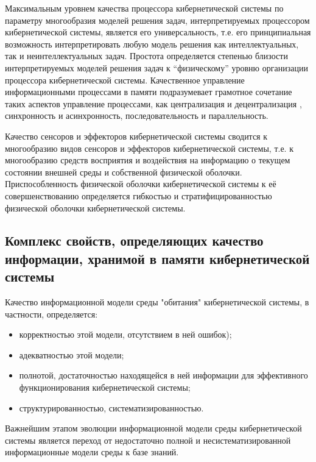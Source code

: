 Максимальным уровнем качества процессора кибернетической системы по параметру многообразия моделей решения задач, интерпретируемых процессором кибернетической системы, является его универсальность, т.е. его принципиальная возможность интерпретировать любую модель решения как интеллектуальных, так и неинтеллектуальных задач. 
Простота определяется степенью близости интерпретируемых моделей решения задач к “физическому” уровню организации процессора кибернетической системы. 
Качественное управление информационными процессами в памяти подразумевает грамотное сочетание таких аспектов управление процессами, как централизация и децентрализация \cite{melekhova2018decentralised}, синхронность и асинхронность, последовательность и параллельность.

Качество сенсоров и эффекторов кибернетической системы сводится к многообразию видов сенсоров и эффекторов кибернетической системы, т.е. к многообразию средств восприятия и воздействия на информацию о текущем состоянии внешней среды и собственной физической оболочки.
Приспособленность физической оболочки кибернетической системы к её совершенствованию определяется гибкостью и стратифицированностью физической оболочки кибернетической системы.



\subsection{Комплекс свойств, определяющих качество информации, хранимой в памяти кибернетической системы}
{\label{sec_cyb_syst_information_quality}} 

Качество информационной модели среды "обитания"{} кибернетической системы, в частности, определяется:
\begin{itemize}
    \item{корректностью этой модели, отсутствием в ней ошибок);}
    \item{адекватностью этой модели;}
    \item{полнотой, достаточностью находящейся в ней информации для эффективного функционирования кибернетической системы;}
    \item{структурированностью, систематизированностью.}
\end{itemize}

Важнейшим этапом эволюции информационной модели среды кибернетической системы является переход от недостаточно полной и несистематизированной информационные модели среды к базе знаний.

